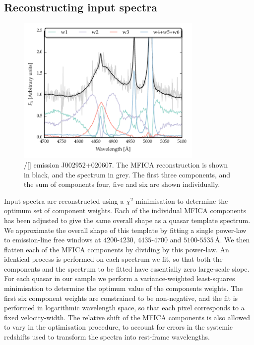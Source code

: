 \subsection{Reconstructing input spectra}

\begin{figure}[t!]
    \centering
    \includegraphics[width=0.8\textwidth]{figures/chapter04/mfica_components.pdf} 
    \caption{\hbns/[] emission J$002952$+$020607$. The MFICA reconstruction is shown in black, and the spectrum in grey. The first three components, and the sum of components four, five and six are shown individually.}     
    \label{fig:mfica_components}
\end{figure}

Input spectra are reconstructed using a $\chi^2$ minimisation to determine the optimum set of component weights. 
Each of the individual MFICA components has been adjusted to give the same overall shape as a quasar template spectrum. 
We approximate the overall shape of this template by fitting a single power-law to emission-line free windows at $4200$-$4230$, $4435$-$4700$ and $5100$-$5535$\,\AA. 
We then flatten each of the MFICA components by dividing by this power-law. 
An identical process is performed on each spectrum we fit, so that both the components and the spectrum to be fitted have essentially zero large-scale slope. 
For each quasar in our sample we perform a variance-weighted least-squares minimisation to determine the optimum value of the components weights.
The first six component weights are constrained to be non-negative, and the fit is performed in logarithmic wavelength space, so that each pixel corresponds to a fixed velocity-width.   
The relative shift of the MFICA components is also allowed to vary in the optimisation procedure, to account for errors in the systemic redshifts used to transform the spectra into rest-frame wavelengths. 

